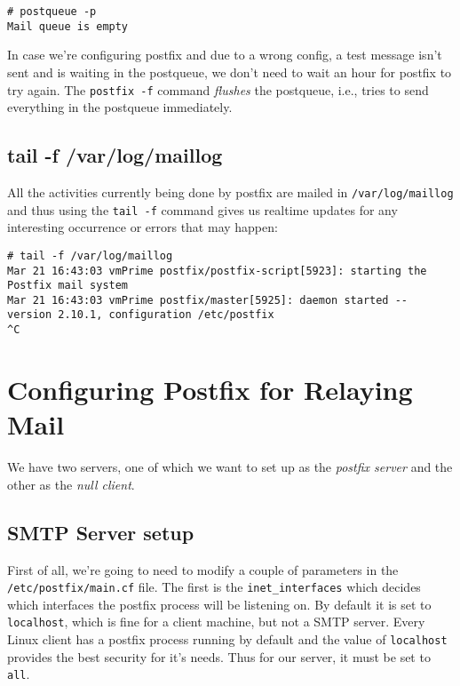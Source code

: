 \vspace{-15pt}
\begin{verbatim}
# postqueue -p
Mail queue is empty
\end{verbatim}
\vspace{-10pt}	

\noindent
In case we're configuring postfix and due to a wrong config, a test message isn't sent and is waiting in the postqueue, we don't need to wait an hour for postfix to try again. The \verb|postfix -f| command \textit{flushes} the postqueue, i.e., tries to send everything in the postqueue immediately. 

\subsection{tail -f /var/log/maillog}
All the activities currently being done by postfix are mailed in \verb|/var/log/maillog| and thus using the \verb|tail -f| command gives us realtime updates for any interesting occurrence or errors that may happen:

\vspace{-15pt}
\begin{verbatim}
# tail -f /var/log/maillog
Mar 21 16:43:03 vmPrime postfix/postfix-script[5923]: starting the Postfix mail system
Mar 21 16:43:03 vmPrime postfix/master[5925]: daemon started -- version 2.10.1, configuration /etc/postfix
^C
\end{verbatim}
\vspace{-10pt}

\section{Configuring Postfix for Relaying Mail}
We have two servers, one of which we want to set up as the \textit{postfix server} and the other as the \textit{null client}. 

\subsection{SMTP Server setup}
First of all, we're going to need to modify a couple of parameters in the \verb|/etc/postfix/main.cf| file. The first is the \verb|inet_interfaces| which decides which interfaces the postfix process will be listening on. By default it is set to \verb|localhost|, which is fine for a client machine, but not a SMTP server. Every Linux client has a postfix process running by default and the value of \verb|localhost| provides the best security for it's needs. Thus for our server, it must be set to \verb|all|.

